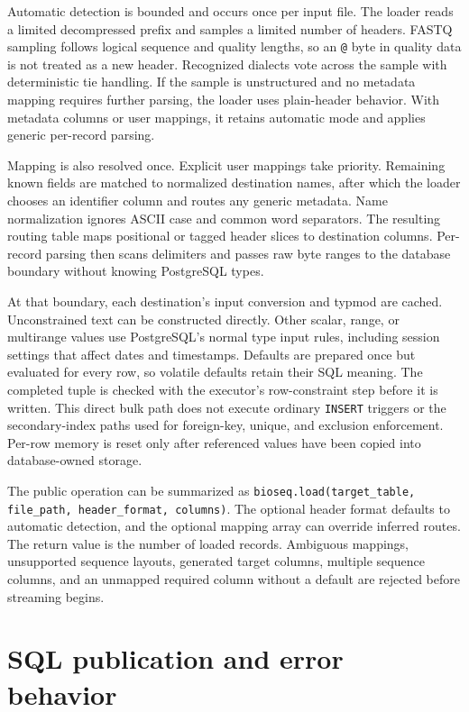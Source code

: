 Automatic detection is bounded and occurs once per input file. The loader
reads a limited decompressed prefix and samples a limited number of headers.
FASTQ sampling follows logical sequence and quality lengths, so an
\texttt{@} byte in quality data is not treated as a new header. Recognized
dialects vote across the sample with deterministic tie handling. If the sample
is unstructured and no metadata mapping requires further parsing, the loader
uses plain-header behavior. With metadata columns or user mappings, it retains
automatic mode and applies generic per-record parsing.

Mapping is also resolved once. Explicit user mappings take priority. Remaining
known fields are matched to normalized destination names, after which the
loader chooses an identifier column and routes any generic metadata. Name
normalization ignores ASCII case and common word separators. The resulting
routing table maps positional or tagged header slices to destination columns.
Per-record parsing then scans delimiters and passes raw byte ranges to the
database boundary without knowing PostgreSQL types.

At that boundary, each destination's input conversion and typmod are cached.
Unconstrained text can be constructed directly. Other scalar, range, or
multirange values use PostgreSQL's normal type input rules, including session
settings that affect dates and timestamps. Defaults are prepared once but
evaluated for every row, so volatile defaults retain their SQL meaning. The
completed tuple is checked with the executor's row-constraint step before it is
written. This direct bulk path does not execute ordinary \texttt{INSERT}
triggers or the secondary-index paths used for foreign-key, unique, and
exclusion enforcement. Per-row memory is reset only after referenced values
have been copied into database-owned storage.

The public operation can be summarized as
\texttt{bioseq.load(target\_table, file\_path, header\_format, columns)}. The
optional header format defaults to automatic detection, and the optional
mapping array can override inferred routes. The return value is the number of
loaded records. Ambiguous mappings, unsupported sequence layouts, generated
target columns, multiple sequence columns, and an unmapped required column
without a default are rejected before streaming begins.

\section{SQL publication and error behavior}
\label{sec:io-sql}

